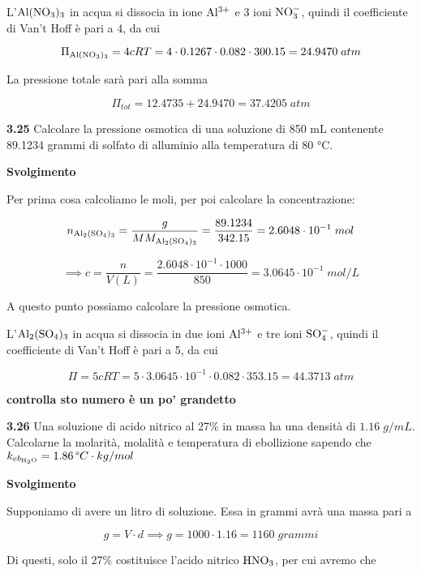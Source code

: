 L'$\rm Al(NO_3)_3$ in acqua si dissocia in ione $\rm Al^{3+}$ e 3 ioni $\rm NO_3^-$, quindi il coefficiente di Van't Hoff è pari a 4, da cui

$$\Pi_{\rm Al(NO_3)_3}=4cRT=4 \cdot 0.1267 \cdot 0.082 \cdot 300.15=24.9470\;atm$$

La pressione totale sarà pari alla somma

$$\Pi_{tot}=12.4735 + 24.9470=37.4205\;atm$$

\vspace{0.2cm}\textbf{3.25} Calcolare la pressione osmotica di una soluzione di 850 mL contenente 89.1234 grammi di solfato di alluminio alla temperatura di 80 °C.

\vspace{0.2cm}\large\textbf{Svolgimento}\normalsize

\vspace{0.2cm}Per prima cosa calcoliamo le moli, per poi calcolare la concentrazione:

$$n_{\rm Al_2(SO_4)_3}=\frac{g}{MM_{\rm Al_2(SO_4)_3}}=\frac{89.1234}{342.15}=2.6048 \cdot 10^{-1}\;mol$$

$$\implies c=\frac{n}{V(L)}=\frac{2.6048 \cdot 10^{-1} \cdot 1000}{850}=3.0645 \cdot 10^{-1}\;mol/L$$

A questo punto possiamo calcolare la pressione osmotica.

L'$\rm Al_2(SO_4)_3$ in acqua si dissocia in due ioni $\rm Al^{3+}$ e tre ioni $\rm SO_4^-$, quindi il coefficiente di Van't Hoff è pari a 5, da cui

$$\Pi=5cRT
=5 \cdot 3.0645 \cdot 10^{-1} \cdot 0.082 \cdot 353.15
=44.3713\;atm$$

\textbf{controlla sto numero è un po' grandetto}

\vspace{0.2cm}\textbf{3.26} Una soluzione di acido nitrico al 27\% in massa ha una densità di $1.16\;g/mL$. Calcolarne la molarità, molalità e temperatura di ebollizione sapendo che $k_{eb_{\rm H_2O}}=1.86\,\text{°}C \cdot kg/mol$

\vspace{0.2cm}\large\textbf{Svolgimento}\normalsize

\vspace{0.2cm}Supponiamo di avere un litro di soluzione. Essa in grammi avrà una massa pari a

$$g=V \cdot d \implies g=1000 \cdot 1.16 = 1160\;grammi$$

Di questi, solo il 27\% costituisce l'acido nitrico $\rm HNO_3$, per cui avremo che

